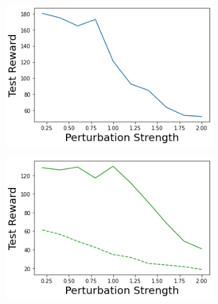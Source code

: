 \begin{figure}
\begin{subfigure}{.24\textwidth}
    \end{subfigure}
    \begin{subfigure}{.24\textwidth}
        \includegraphics[width=\textwidth]{sections/011_icml2022/resources/action_shift-DKL-CartPoleShift-v0-mean_reward_.png}
    \end{subfigure}
    \begin{subfigure}{.24\textwidth}
        \includegraphics[width=\textwidth]{sections/011_icml2022/resources/action_shift-PostNet-CartPoleShift-v0-mean_reward_.png}
    \end{subfigure}
    

\end{figure}
